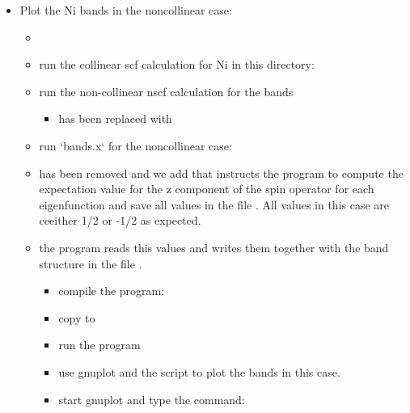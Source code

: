 \documentclass[landscape]{foils}
\begin{document}
\begin{itemize}
  \item  Plot the Ni bands in the noncollinear case:
  \begin{itemize}
    \item {} 
    \item run the collinear scf  calculation for Ni in this directory:\\
    \item run the non-collinear nscf calculation for the bands
    \begin{itemize}
      \item  {} has been replaced with  \\ 
    \end{itemize}
    \item run `bands.x` for the noncollinear case: 
    \item  {} has been removed and we add  that instructs 
       the program to compute the expectation value for the z component of the spin operator for each
        eigenfunction and save all values in the file . All values in this case are 
        ceeither 1/2 or -1/2 as expected. 
    \item the program  reads this values and writes them together 
       with the band structure in the file  .
       \begin{itemize}
         \item  compile the program: \\
         \item  copy  to  
         \item run the program \\
         \item use gnuplot and the script  to plot the bands in this case. 
         \item start {gnuplot} and type the command: \\
       \end{itemize}
    \end{itemize}
\end{itemize}
\end{document}
